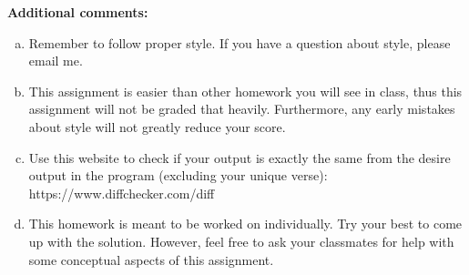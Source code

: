 \documentclass[12pt]{article}
\theoremstyle{definition}
\theoremstyle{definition}
\theoremstyle{remark}
\theoremstyle{remark}
\begin{document}
	\noindent
	\textbf{Additional comments:}
	\begin{enumerate}[(a)]
		\item Remember to follow proper style. If you have a question about style, please email me.
		
		\item This assignment is easier than other homework you will see in class, thus this assignment will not be graded that heavily. Furthermore, any early mistakes about style will not greatly reduce your score.
		
		\item Use this website to check if your output is exactly the same from the desire output in the program (excluding your unique verse): \\
		https://www.diffchecker.com/diff
		
		\item This homework is meant to be worked on individually. Try your best to come up with the solution. However, feel free to ask your classmates for help with some conceptual aspects of this assignment.
	\end{enumerate}
	
\end{document}
